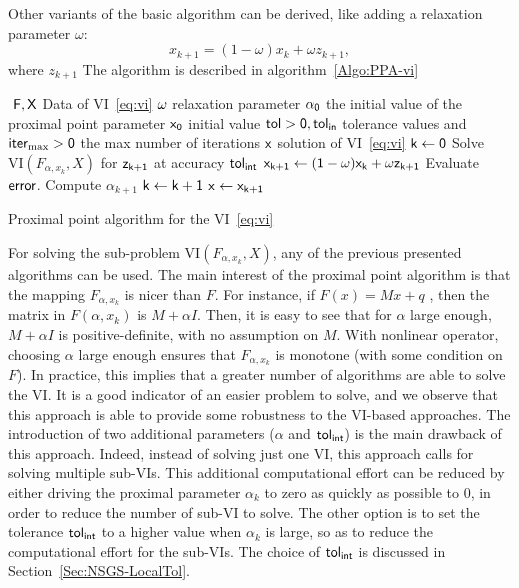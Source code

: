 Other variants of the basic algorithm can be derived, like adding a relaxation parameter $\omega$:
\begin{equation}
  \label{eq:prox-algo-2}
  x_{k+1} = (1-\omega) x_{k} + \omega z_{k+1},
\end{equation}
where $z_{k+1}$
The algorithm is described in algorithm~\ref{Algo:PPA-vi}
\begin{algorithm}
  \begin{algorithmic}
    {\sf
      \STATE $ $
      \REQUIRE $\sf F,X$ Data of VI~\eqref{eq:vi}
      \REQUIRE $\sf \omega$ relaxation parameter
      \REQUIRE $\sf \alpha_0$ the initial value of the proximal point parameter
      \REQUIRE $\sf x_0$ initial value
      \REQUIRE $\sf tol >0, tol_{in}$ tolerance values and $\sf iter_{\max}  >0$ the max number of iterations
      \ENSURE  $\sf x$ solution of VI~\eqref{eq:vi}
      \STATE   $\sf k \leftarrow 0$ 
      \STATE Solve $\mathrm{VI}(F_{\alpha,x_k},X)$ for $\sf z_{k+1}$ at accuracy $\sf tol_{int}$
      \STATE $\sf x_{k+1} \leftarrow (1-\omega) x_{k} + \omega z_{k+1}$
      \STATE Evaluate $\sf error$.
      \STATE Compute $\alpha_{k+1}$
      \STATE $\sf k \leftarrow k+1$
      \ENDWHILE
      \STATE $\sf x \leftarrow x_{k+1}$ 
    }
  \end{algorithmic}
  \caption{Proximal point algorithm for the VI~\eqref{eq:vi}}  \label{Algo:PPA-vi}
\end{algorithm}

For solving the sub-problem $\mathrm{VI}(F_{\alpha,x_k},X)$, any of the previous presented algorithms can be used.
The main interest of the proximal point algorithm is that the mapping $F_{\alpha, x_k}$ is nicer than $F$.
For instance, if $F(x)=Mx+q$ , then the matrix in $F(\alpha, x_k)$ is $M + \alpha I$.
Then, it is easy to see that for $\alpha$ large enough, $M + \alpha I$ is positive-definite, with no assumption on $M$.
With nonlinear operator, choosing $\alpha$ large enough ensures that $F_{\alpha, x_k}$ is monotone (with some condition on $F$).
In practice, this implies that a greater number of algorithms are able to solve the VI.
It is a good indicator of an easier problem to solve, and we observe that this approach is able to provide some robustness
to the VI-based approaches.
The introduction of two additional parameters ($\alpha$ and $\sf tol_{int}$) is the main drawback of this approach.
Indeed, instead of solving just one VI, this approach calls for solving multiple sub-VIs.
This additional computational effort can be reduced by either driving the proximal parameter $\alpha_k$ to zero as quickly as possible to $0$,
in order to reduce the number of sub-VI to solve. The other option is to set the tolerance $\sf tol_{int}$ to a higher value when $\alpha_k$ is large,
so as to reduce the computational effort for the sub-VIs.
The choice of $\sf tol_{int}$ is discussed in Section~\ref{Sec:NSGS-LocalTol}.

